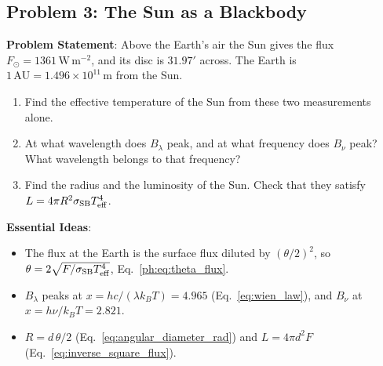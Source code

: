 \subsection{Problem 3: The Sun as a Blackbody}
\label{ph:prob:sun}

\textbf{Problem Statement}: Above the Earth's air the Sun gives the flux $F_\odot=1361\,\mathrm{W\,m^{-2}}$, and its disc is $31.97'$ across. The Earth is $1\,\mathrm{AU}=1.496\times10^{11}\,\mathrm m$ from the Sun.
\begin{enumerate}[label=(\alph*)]
	\item Find the effective temperature of the Sun from these two measurements alone.
	\item At what wavelength does $B_\lambda$ peak, and at what frequency does $B_\nu$ peak? What wavelength belongs to that frequency?
	\item Find the radius and the luminosity of the Sun. Check that they satisfy $L=4\pi R^2\sigma_{\rm SB}T_{\rm eff}^4$.
\end{enumerate}

\textbf{Essential Ideas}:
\begin{itemize}
	\item The flux at the Earth is the surface flux diluted by $(\theta/2)^2$, so $\theta=2\sqrt{F/\sigma_{\rm SB}T_{\rm eff}^4}$, Eq.~\eqref{ph:eq:theta_flux}.
	\item $B_\lambda$ peaks at $x=hc/(\lambda k_BT)=4.965$ (Eq.~\eqref{eq:wien_law}), and $B_\nu$ at $x=h\nu/k_BT=2.821$.
	\item $R=d\,\theta/2$ (Eq.~\eqref{eq:angular_diameter_rad}) and $L=4\pi d^2F$ (Eq.~\eqref{eq:inverse_square_flux}).
\end{itemize}

